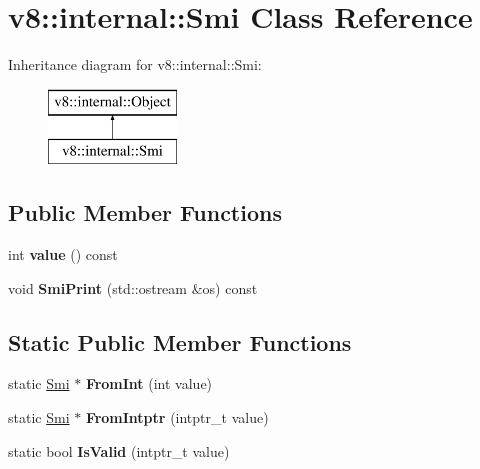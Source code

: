 \hypertarget{classv8_1_1internal_1_1_smi}{}\section{v8\+:\+:internal\+:\+:Smi Class Reference}
\label{classv8_1_1internal_1_1_smi}
Inheritance diagram for v8\+:\+:internal\+:\+:Smi\+:\begin{figure}[H]
\begin{center}
\leavevmode
\includegraphics[height=2.000000cm]{classv8_1_1internal_1_1_smi}
\end{center}
\end{figure}
\subsection*{Public Member Functions}
\begin{DoxyCompactItemize}
\item 
int {\bfseries value} () const \hypertarget{classv8_1_1internal_1_1_smi_a524bdb2a995328dbaf74f29138834584}{}\label{classv8_1_1internal_1_1_smi_a524bdb2a995328dbaf74f29138834584}

\item 
void {\bfseries Smi\+Print} (std\+::ostream \&os) const \hypertarget{classv8_1_1internal_1_1_smi_aa0bd4fe08ec31cc28c60960c2223041b}{}\label{classv8_1_1internal_1_1_smi_aa0bd4fe08ec31cc28c60960c2223041b}

\end{DoxyCompactItemize}
\subsection*{Static Public Member Functions}
\begin{DoxyCompactItemize}
\item 
static \hyperlink{classv8_1_1internal_1_1_smi}{Smi} $\ast$ {\bfseries From\+Int} (int value)\hypertarget{classv8_1_1internal_1_1_smi_a383e583ce233c553f4d10f7c55ce65ac}{}\label{classv8_1_1internal_1_1_smi_a383e583ce233c553f4d10f7c55ce65ac}

\item 
static \hyperlink{classv8_1_1internal_1_1_smi}{Smi} $\ast$ {\bfseries From\+Intptr} (intptr\+\_\+t value)\hypertarget{classv8_1_1internal_1_1_smi_aeaba1412716eba47061190e11c14d861}{}\label{classv8_1_1internal_1_1_smi_aeaba1412716eba47061190e11c14d861}

\item 
static bool {\bfseries Is\+Valid} (intptr\+\_\+t value)\hypertarget{classv8_1_1internal_1_1_smi_af4f9beb5f4e2edba1b52805e819486d2}{}\label{classv8_1_1internal_1_1_smi_af4f9beb5f4e2edba1b52805e819486d2}

\end{DoxyCompactItemize}
